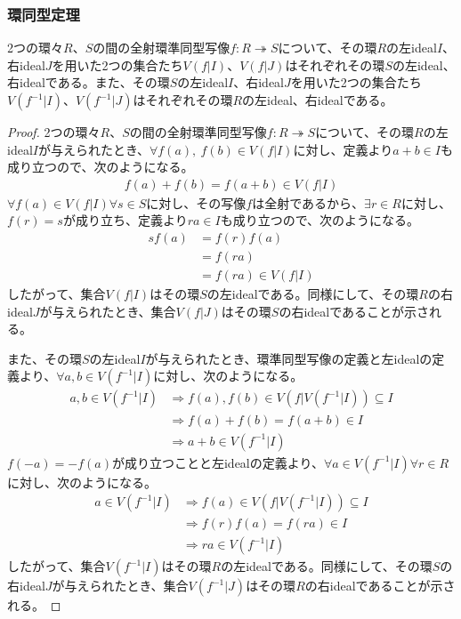 \documentclass[dvipdfmx]{jsarticle}
\begin{document}
\subsubsection{環同型定理}%
\begin{thm}\label{3.3.2.22}
2つの環々$R$、$S$の間の全射環準同型写像$f:R \twoheadrightarrow S$について、その環$R$の左ideal$I$、右ideal$J$を用いた2つの集合たち$V\left( f|I \right)$、$V\left( f|J \right)$はそれぞれその環$S$の左ideal、右idealである。また、その環$S$の左ideal$I$、右ideal$J$を用いた2つの集合たち$V\left( f^{- 1}|I \right)$、$V\left( f^{- 1}|J \right)$はそれぞれその環$R$の左ideal、右idealである。
\end{thm}
\begin{proof}
2つの環々$R$、$S$の間の全射環準同型写像$f:R \twoheadrightarrow S$について、その環$R$の左ideal$I$が与えられたとき、$\forall f(a),\ f(b) \in V\left( f|I \right)$に対し、定義より$a + b \in I$も成り立つので、次のようになる。
\begin{align*}
f(a) + f(b) = f(a + b) \in V\left( f|I \right)
\end{align*}
$\forall f(a) \in V\left( f|I \right)\forall s \in S$に対し、その写像$f$は全射であるから、$\exists r \in R$に対し、$f(r) = s$が成り立ち、定義より$ra \in I$も成り立つので、次のようになる。
\begin{align*}
sf(a) &= f(r)f(a)\\
&= f(ra)\\
&= f(ra) \in V\left( f|I \right)
\end{align*}
したがって、集合$V\left( f|I \right)$はその環$S$の左idealである。同様にして、その環$R$の右ideal$J$が与えられたとき、集合$V\left( f|J \right)$はその環$S$の右idealであることが示される。\par
また、その環$S$の左ideal$I$が与えられたとき、環準同型写像の定義と左idealの定義より、$\forall a,b \in V\left( f^{- 1}|I \right)$に対し、次のようになる。
\begin{align*}
a,b \in V\left( f^{- 1}|I \right) &\Rightarrow f(a),f(b) \in V\left( f|V\left( f^{- 1}|I \right) \right) \subseteq I\\
&\Rightarrow f(a) + f(b) = f(a + b) \in I\\
&\Rightarrow a + b \in V\left( f^{- 1}|I \right)
\end{align*}
$f( - a) = - f(a)$が成り立つことと左idealの定義より、$\forall a \in V\left( f^{- 1}|I \right)\forall r \in R$に対し、次のようになる。
\begin{align*}
a \in V\left( f^{- 1}|I \right) &\Rightarrow f(a) \in V\left( f|V\left( f^{- 1}|I \right) \right) \subseteq I\\
&\Rightarrow f(r)f(a) = f(ra) \in I\\
&\Rightarrow ra \in V\left( f^{- 1}|I \right)
\end{align*}
したがって、集合$V\left( f^{- 1}|I \right)$はその環$R$の左idealである。同様にして、その環$S$の右ideal$J$が与えられたとき、集合$V\left( f^{- 1}|J \right)$はその環$R$の右idealであることが示される。
\end{proof}
\end{document}
